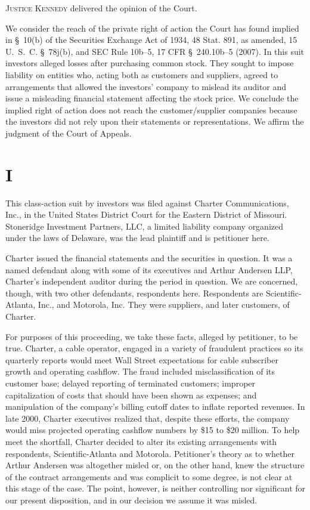 
\setcounter{page}{152}

  \textsc{Justice Kennedy} delivered the opinion of the Court.

  We consider the reach of the private right of action the Court has found implied in \S~10(b) of the Securities Exchange Act of 1934, 48 Stat. 891, as amended, 15 U.~S.~C. \S~78j(b), and SEC Rule 10b--5, 17 CFR \S~240.10b--5 (2007). In this suit investors alleged losses after purchasing common stock. They sought to impose liability on entities who, acting both as customers and suppliers, agreed to arrangements that allowed the investors' company to mislead its auditor and issue \newpage  a misleading financial statement affecting the stock price. We conclude the implied right of action does not reach the customer/supplier companies because the investors did not rely upon their statements or representations. We affirm the judgment of the Court of Appeals.

\section{I}

  This class-action suit by investors was filed against Charter Communications, Inc., in the United States District Court for the Eastern District of Missouri. Stoneridge Investment Partners, LLC, a limited liability company organized under the laws of Delaware, was the lead plaintiff and is petitioner here.

  Charter issued the financial statements and the securities in question. It was a named defendant along with some of its executives and Arthur Andersen LLP, Charter's independent auditor during the period in question. We are concerned, though, with two other defendants, respondents here. Respondents are Scientific-Atlanta, Inc., and Motorola, Inc. They were suppliers, and later customers, of Charter.

  For purposes of this proceeding, we take these facts, alleged by petitioner, to be true. Charter, a cable operator, engaged in a variety of fraudulent practices so its quarterly reports would meet Wall Street expectations for cable subscriber growth and operating cashflow. The fraud included misclassification of its customer base; delayed reporting of terminated customers; improper capitalization of costs that should have been shown as expenses; and manipulation of the company's billing cutoff dates to inflate reported revenues. In late 2000, Charter executives realized that, despite these efforts, the company would miss projected operating cashflow numbers by \$15 to \$20 million. To help meet the shortfall, Charter decided to alter its existing arrangements with respondents, Scientific-Atlanta and Motorola. Peti\newpage tioner's theory as to whether Arthur Andersen was altogether misled or, on the other hand, knew the structure of the contract arrangements and was complicit to some degree, is not clear at this stage of the case. The point, however, is neither controlling nor significant for our present disposition, and in our decision we assume it was misled.

